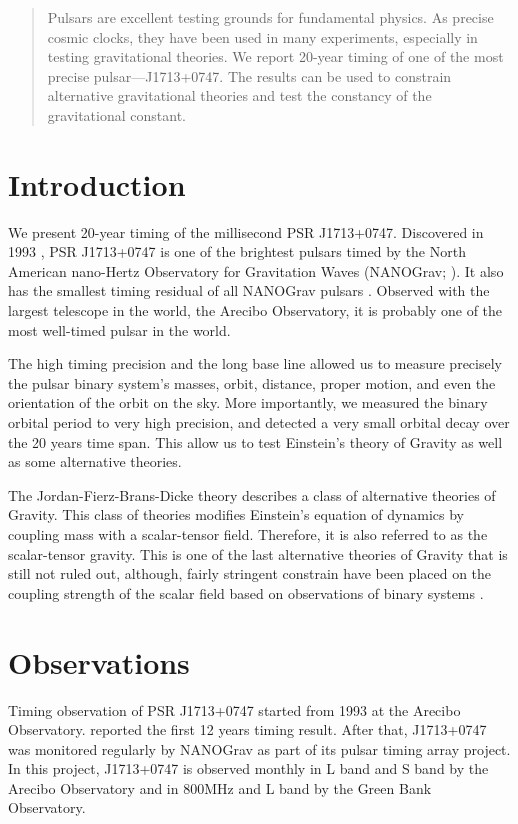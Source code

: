 
\begin{abstract}
Pulsars are excellent testing grounds for fundamental physics. As precise
cosmic clocks, they have been used in many experiments, especially in testing
gravitational theories. We report 20-year timing of one of the most precise
pulsar---J1713+0747. The results can be used to constrain alternative
gravitational theories and test the constancy of the gravitational constant.
\end{abstract}


\section{Introduction}
We present 20-year timing of the millisecond  PSR J1713+0747. Discovered in
1993 \citep{fwc93}, PSR J1713+0747 is one of the brightest pulsars timed by the
North American nano-Hertz Observatory for Gravitation Waves (NANOGrav;
\citealt{ndf+12, dfg+13}). It also has the smallest timing residual of all NANOGrav pulsars \citep{dfg+13}. Observed with the largest telescope in the world, the Arecibo Observatory, it is probably one of the most well-timed pulsar in the world.

The high timing precision and the long base line allowed us to measure precisely
the pulsar binary system's  masses, orbit, distance, proper motion, and even
the orientation of the orbit on the sky. More importantly, 
we measured the binary orbital period to very high precision, and detected a
very small orbital decay over the 20 years time span. This allow us to test
Einstein's theory of Gravity as well as some alternative theories.


The Jordan-Fierz-Brans-Dicke theory \citep{jor59,fie56,bd61} describes a class of alternative theories of Gravity. 
This class of theories modifies Einstein's equation of dynamics by coupling
mass with a scalar-tensor
field. Therefore, it is also referred to as the scalar-tensor gravity. 
This is one of the last alternative theories of Gravity that is still not
ruled out, although, fairly stringent constrain have been placed on the coupling
strength of the scalar field based on observations of binary systems
\citep{hmb10, lwj+09, fwe+12}.


\section{Observations}
Timing observation of PSR J1713+0747 started from 1993 at the Arecibo Observatory. \citet{sns+05} reported the first 12 years timing result. After that, J1713+0747 was monitored regularly by NANOGrav as part of its pulsar timing array project. In this project, J1713+0747 is observed monthly in L band and S band by the Arecibo Observatory and in 800MHz and L band by the Green Bank Observatory.

